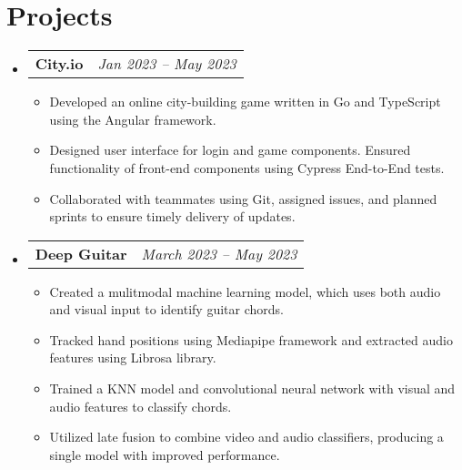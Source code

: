 \documentclass[letterpaper,11pt]{article}
\makeatletter
\newcommand{\resumeItemExperience}[1]{
  \item\small{
    {#1 \vspace{-2pt}}
  }
}
\newcommand{\resumeSubheadingProject}[2]{
  \vspace{-1pt}\item
    \begin{tabular*}{0.97\textwidth}{l@{\extracolsep{\fill}}r}
      \textbf{#1} & \textit{\small #2} \\
    \end{tabular*}\vspace{-5pt}
}
\newcommand{\resumeSubHeadingListStart}{\begin{itemize}[leftmargin=*, label={}]}
\newcommand{\resumeSubHeadingListEnd}{\end{itemize}}
\newcommand{\resumeItemListStart}{\begin{itemize}}
\newcommand{\resumeItemListEnd}{\end{itemize}\vspace{-5pt}}
\makeatother
\begin{document}
\section{Projects}
  \resumeSubHeadingListStart
        \resumeSubheadingProject
          {City.io}{Jan 2023 -- May 2023}
          \resumeItemListStart
            \resumeItemExperience
              {Developed an online city-building game written in Go and TypeScript using the Angular framework.}
            \resumeItemExperience
              {Designed user interface for login and game components. Ensured functionality of front-end components using Cypress End-to-End tests.}
            \resumeItemExperience
              {Collaborated with teammates using Git, assigned issues, and planned sprints to ensure timely delivery of updates.}
          \resumeItemListEnd
        \resumeSubheadingProject
          {Deep Guitar}{March 2023 -- May 2023}
          \resumeItemListStart
            \resumeItemExperience
              {Created a mulitmodal machine learning model, which uses both audio and visual input to identify guitar chords.}
            \resumeItemExperience
              {Tracked hand positions using Mediapipe framework and extracted audio features using Librosa library.}
            \resumeItemExperience
              {Trained a KNN model and convolutional neural network with visual and audio features to classify chords.}
            \resumeItemExperience
              {Utilized late fusion to combine video and audio classifiers, producing a single model with improved performance.}
          \resumeItemListEnd
    \resumeSubHeadingListEnd
    
\end{document}
